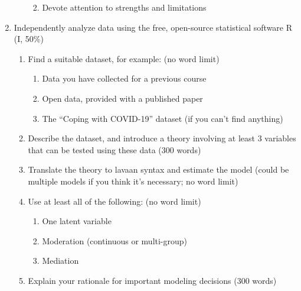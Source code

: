 \documentclass[
  letterpaper,
]{scrbook}
\providecommand{\tightlist}{%
  \setlength{\itemsep}{0pt}\setlength{\parskip}{0pt}}\usepackage{longtable,booktabs,array}
\begin{document}
\begin{enumerate}
\begin{enumerate}
    \begin{enumerate}
    \def\labelenumiii{\roman{enumiii}.}
    \tightlist
    \item
      Devote attention to strengths and limitations
    \end{enumerate}
  \end{enumerate}
\item
  Independently analyze data using the free, open-source statistical
  software R (I, 50\%)

  \begin{enumerate}
  \def\labelenumii{\alph{enumii}.}
  \tightlist
  \item
    Find a suitable dataset, for example: (no word limit)

    \begin{enumerate}
    \def\labelenumiii{\roman{enumiii}.}
    \tightlist
    \item
      Data you have collected for a previous course
    \item
      Open data, provided with a published paper
    \item
      The ``Coping with COVID-19'' dataset (if you can't find anything)
    \end{enumerate}
  \item
    Describe the dataset, and introduce a theory involving at least 3
    variables that can be tested using these data (300 words)
  \item
    Translate the theory to lavaan syntax and estimate the model (could
    be multiple models if you think it's necessary; no word limit)
  \item
    Use at least all of the following: (no word limit)

    \begin{enumerate}
    \def\labelenumiii{\roman{enumiii}.}
    \tightlist
    \item
      One latent variable
    \item
      Moderation (continuous or multi-group)
    \item
      Mediation
    \end{enumerate}
  \item
    Explain your rationale for important modeling decisions (300 words)


\end{enumerate}
\end{enumerate}
\end{document}
